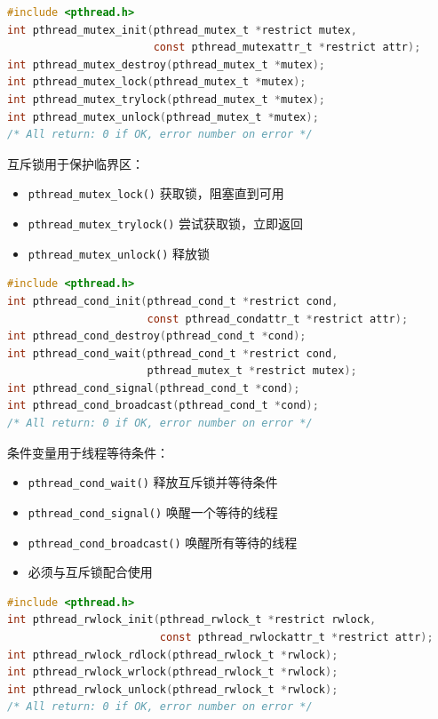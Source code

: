 
\begin{lstlisting}[language=C]
#include <pthread.h>
int pthread_mutex_init(pthread_mutex_t *restrict mutex,
                       const pthread_mutexattr_t *restrict attr);
int pthread_mutex_destroy(pthread_mutex_t *mutex);
int pthread_mutex_lock(pthread_mutex_t *mutex);
int pthread_mutex_trylock(pthread_mutex_t *mutex);
int pthread_mutex_unlock(pthread_mutex_t *mutex);
/* All return: 0 if OK, error number on error */
\end{lstlisting}

互斥锁用于保护临界区：
\begin{itemize}
  \item \texttt{pthread\_mutex\_lock()} 获取锁，阻塞直到可用
  \item \texttt{pthread\_mutex\_trylock()} 尝试获取锁，立即返回
  \item \texttt{pthread\_mutex\_unlock()} 释放锁
\end{itemize}


\begin{lstlisting}[language=C]
#include <pthread.h>
int pthread_cond_init(pthread_cond_t *restrict cond,
                      const pthread_condattr_t *restrict attr);
int pthread_cond_destroy(pthread_cond_t *cond);
int pthread_cond_wait(pthread_cond_t *restrict cond,
                      pthread_mutex_t *restrict mutex);
int pthread_cond_signal(pthread_cond_t *cond);
int pthread_cond_broadcast(pthread_cond_t *cond);
/* All return: 0 if OK, error number on error */
\end{lstlisting}

条件变量用于线程等待条件：
\begin{itemize}
  \item \texttt{pthread\_cond\_wait()} 释放互斥锁并等待条件
  \item \texttt{pthread\_cond\_signal()} 唤醒一个等待的线程
  \item \texttt{pthread\_cond\_broadcast()} 唤醒所有等待的线程
  \item 必须与互斥锁配合使用
\end{itemize}


\begin{lstlisting}[language=C]
#include <pthread.h>
int pthread_rwlock_init(pthread_rwlock_t *restrict rwlock,
                        const pthread_rwlockattr_t *restrict attr);
int pthread_rwlock_rdlock(pthread_rwlock_t *rwlock);
int pthread_rwlock_wrlock(pthread_rwlock_t *rwlock);
int pthread_rwlock_unlock(pthread_rwlock_t *rwlock);
/* All return: 0 if OK, error number on error */
\end{lstlisting}

